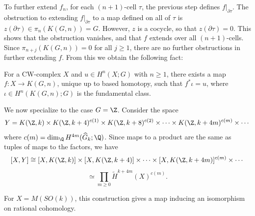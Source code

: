 To further extend $f_n$, for each $(n+1)$-cell $\tau$, the previous step defines $f|_{\partial\tau}$. The obstruction to extending $f|_{\partial \tau}$ to a map defined on all of $\tau$ is $z(\partial \tau)\in \pi_n(K(G,n))=G$. However, $z$ is a cocycle, so that $z(\partial \tau)=0$. This shows that the obstruction vanishes, and that $f$ extends over all $(n+1)$-cells. Since $\pi_{n+j}(K(G,n))=0$ for all $j\geq 1$, there are no further obstructions in further extending $f$. From this we obtain the following fact:
\begin{proposition}
    For a CW-complex $X$ and $u\in H^n(X;G)$ with $n\geq 1$, there exists a map $f:X\to K(G,n)$, unique up to based homotopy, such that $f^*\iota=u$, where $\iota\in H^n(K(G,n);G)$ is the fundamental class.
\end{proposition}
We now specialize to the case $G=\Z$. Consider the space 
\[Y=K(\Z,k)\times K(\Z, k+4)^{c(1)}\times  K(\Z, k+8)^{c(2)}\times\cdots\times K(\Z, k+4m)^{c(m)}\times\cdots\]
where $c(m)=\dim_\Q H^{4m}(\widehat G_k;\Q)$. Since maps to a product are the same as tuples of maps to the factors, we
have
\[[X,Y]\cong [X,K(\Z,k)]\times[X,K(\Z,k+4)]\times\cdots \times [X,K(\Z, k+4m)]^{c(m)}\times\cdots\]
\[\simeq \prod_{m\geq 0} \widetilde H^{k+4m}(X)^{c(m)}. \]
\begin{proposition}
    For $X=M(SO(k))$, this construction gives a map inducing an isomorphism on rational cohomology. 
\end{proposition}
